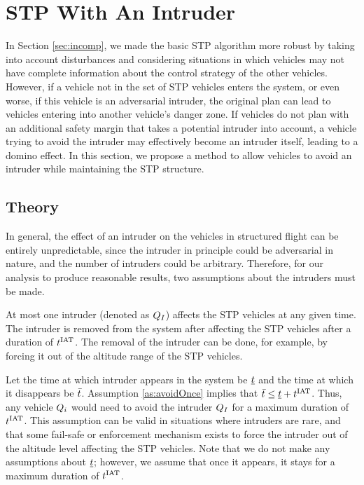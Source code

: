 \section{STP With An Intruder \label{sec:intruder}}
In Section \ref{sec:incomp}, we made the basic STP algorithm more robust by taking into account disturbances and considering situations in which vehicles may not have complete information about the control strategy of the other vehicles. However, if a vehicle not in the set of STP vehicles enters the system, or even worse, if this vehicle is an adversarial intruder, the original plan can lead to vehicles entering into another vehicle's danger zone. If vehicles do not plan with an additional safety margin that takes a potential intruder into account, a vehicle trying to avoid the intruder may effectively become an intruder itself, leading to a domino effect. In this section, we propose a method to allow vehicles to avoid an intruder while maintaining the STP structure.

\subsection{Theory}
In general, the effect of an intruder on the vehicles in structured flight can be entirely unpredictable, since the intruder in principle could be adversarial in nature, and the number of intruders could be arbitrary. Therefore, for our analysis to produce reasonable results, two assumptions about the intruders must be made.

\begin{assumption}
\label{as:avoidOnce}
At most one intruder (denoted as $Q_I$) affects the STP vehicles at any given time. The intruder is removed from the system after affecting the STP vehicles after a duration of $t^\text{IAT}$. The removal of the intruder can be done, for example, by forcing it out of the altitude range of the STP vehicles.
\end{assumption}

Let the time at which intruder appears in the system be $\underline{t}$ and the time at which it disappears be $\bar{t}$. Assumption \ref{as:avoidOnce} implies that $\bar{t} \leq \underline{t} + t^\text{IAT}$. Thus, any vehicle $Q_i$ would need to avoid the intruder $Q_{I}$ for a maximum duration of $t^\text{IAT}$. This assumption can be valid in situations where intruders are rare, and that some fail-safe or enforcement mechanism exists to force the intruder out of the altitude level affecting the STP vehicles. Note that we do not make any assumptions about $\underline{t}$; however, we assume that once it appears, it stays for a maximum duration of $t^\text{IAT}$.

